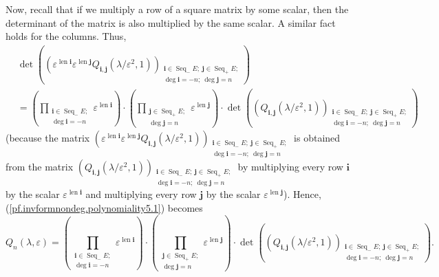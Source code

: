 \documentclass
[numbers=enddot,12pt,final,onecolumn,german,notitlepage]{scrartcl}%
\theoremstyle{definition}
\begin{document}
Now, recall that if we multiply a row of a square matrix by some scalar, then
the determinant of the matrix is also multiplied by the same scalar. A similar
fact holds for the columns. Thus,
\begin{align*}
&  \det\left(  \left(  \varepsilon^{\operatorname*{len}\mathbf{i}}%
\varepsilon^{\operatorname*{len}\mathbf{j}}Q_{\mathbf{i},\mathbf{j}}\left(
\lambda/\varepsilon^{2},1\right)  \right)  _{\substack{\mathbf{i}%
\in\operatorname*{Seq}\nolimits_{-}E;\ \mathbf{j}\in\operatorname*{Seq}%
\nolimits_{+}E;\\\deg\mathbf{i}=-n;\ \deg\mathbf{j}=n}}\right) \\
&  =\left(  \prod\limits_{\substack{\mathbf{i}\in\operatorname*{Seq}%
\nolimits_{-}E;\\\deg\mathbf{i}=-n}}\varepsilon^{\operatorname*{len}%
\mathbf{i}}\right)  \cdot\left(  \prod\limits_{\substack{\mathbf{j}%
\in\operatorname*{Seq}\nolimits_{+}E;\\\deg\mathbf{j}=n}}\varepsilon
^{\operatorname*{len}\mathbf{j}}\right)  \cdot\det\left(  \left(
Q_{\mathbf{i},\mathbf{j}}\left(  \lambda/\varepsilon^{2},1\right)  \right)
_{\substack{\mathbf{i}\in\operatorname*{Seq}\nolimits_{-}E;\ \mathbf{j}%
\in\operatorname*{Seq}\nolimits_{+}E;\\\deg\mathbf{i}=-n;\ \deg\mathbf{j}%
=n}}\right)
\end{align*}
(because the matrix $\left(  \varepsilon^{\operatorname*{len}\mathbf{i}%
}\varepsilon^{\operatorname*{len}\mathbf{j}}Q_{\mathbf{i},\mathbf{j}}\left(
\lambda/\varepsilon^{2},1\right)  \right)  _{\substack{\mathbf{i}%
\in\operatorname*{Seq}\nolimits_{-}E;\ \mathbf{j}\in\operatorname*{Seq}%
\nolimits_{+}E;\\\deg\mathbf{i}=-n;\ \deg\mathbf{j}=n}}$ is obtained from the
matrix $\left(  Q_{\mathbf{i},\mathbf{j}}\left(  \lambda/\varepsilon
^{2},1\right)  \right)  _{\substack{\mathbf{i}\in\operatorname*{Seq}%
\nolimits_{-}E;\ \mathbf{j}\in\operatorname*{Seq}\nolimits_{+}E;\\\deg
\mathbf{i}=-n;\ \deg\mathbf{j}=n}}$ by multiplying every row $\mathbf{i}$ by
the scalar $\varepsilon^{\operatorname*{len}\mathbf{i}}$ and multiplying every
row $\mathbf{j}$ by the scalar $\varepsilon^{\operatorname*{len}\mathbf{j}}$).
Hence, (\ref{pf.invformnondeg.polynomiality5.1}) becomes%
\begin{equation}
Q_{n}\left(  \lambda,\varepsilon\right)  =\left(  \prod
\limits_{\substack{\mathbf{i}\in\operatorname*{Seq}\nolimits_{-}%
E;\\\deg\mathbf{i}=-n}}\varepsilon^{\operatorname*{len}\mathbf{i}}\right)
\cdot\left(  \prod\limits_{\substack{\mathbf{j}\in\operatorname*{Seq}%
\nolimits_{+}E;\\\deg\mathbf{j}=n}}\varepsilon^{\operatorname*{len}\mathbf{j}%
}\right)  \cdot\det\left(  \left(  Q_{\mathbf{i},\mathbf{j}}\left(
\lambda/\varepsilon^{2},1\right)  \right)  _{\substack{\mathbf{i}%
\in\operatorname*{Seq}\nolimits_{-}E;\ \mathbf{j}\in\operatorname*{Seq}%
\nolimits_{+}E;\\\deg\mathbf{i}=-n;\ \deg\mathbf{j}=n}}\right)  .
\label{pf.invformnondeg.polynomiality5.3}%
\end{equation}
\end{document}

